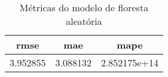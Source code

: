 \begin{table}
\centering
\caption{Métricas do modelo de floresta aleatória}
\label{tab:rf_metrics}
\begin{tabular}{ccc}
\toprule
    rmse &      mae &         mape \\
\midrule
3.952855 & 3.088132 & 2.852175e+14 \\
\bottomrule
\end{tabular}
\end{table}
